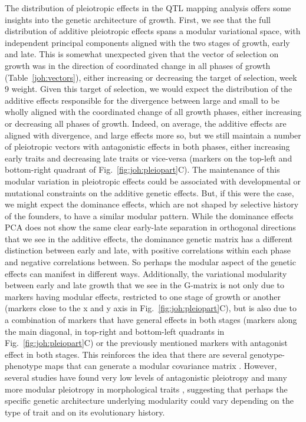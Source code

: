 \begin{refsection}
The distribution of pleiotropic effects in the QTL mapping analysis
offers some insights into the genetic architecture of growth. First, we
see that the full distribution of additive pleiotropic effects spans a
modular variational space, with independent principal components aligned
with the two stages of growth, early and late. This is somewhat
unexpected given that the vector of selection on growth was in the
direction of coordinated change in all phases of growth (Table~\ref{joh:vectors}),
either increasing or decreasing the target of selection, week 9 weight.
Given this target of selection, we would expect the distribution of the
additive effects responsible for the divergence between large and small
to be wholly aligned with the coordinated change of all growth phases,
either increasing or decreasing all phases of growth. Indeed, on
average, the additive effects are aligned with divergence, and large
effects more so, but we still maintain a number of pleiotropic vectors
with antagonistic effects in both phases, either increasing early traits
and decreasing late traits or vice-versa (markers on the top-left and
bottom-right quadrant of Fig.~\ref{fig:joh:pleiopart}C). The maintenance of this modular
variation in pleiotropic effects could be associated with developmental
or mutational constraints on the additive genetic effects. But, if this
were the case, we might expect the dominance effects, which are not
shaped by selective history of the founders, to have a similar modular
pattern. While the dominance effects PCA does not show the same clear
early-late separation in orthogonal directions that we see in the
additive effects, the dominance genetic matrix has a different
distinction between early and late, with positive correlations within
each phase and negative correlations between. So perhaps the modular
aspect of the genetic effects can manifest in different ways.
Additionally, the variational modularity between early and late growth
that we see in the G-matrix is not only due to markers having modular
effects, restricted to one stage of growth or another (markers close to
the x and y axis in Fig.~\ref{fig:joh:pleiopart}C), but is also due to a combination of
markers that have general effects in both stages (markers along the main
diagonal, in top-right and bottom-left quadrants in Fig.~\ref{fig:joh:pleiopart}C) or the
previously mentioned markers with antagonist effect in both stages. This
reinforces the idea that there are several genotype-phenotype maps that
can generate a modular covariance matrix \parencite{Pavlicev2011-xm}.
However, several studies have found very low levels of antagonistic
pleiotropy and many more modular pleiotropy in morphological traits
\parencite{Leamy1999-dm,Leamy2002-nh,Kenney-Hunt2008-bd}, suggesting that perhaps
the specific genetic architecture underlying modularity could vary
depending on the type of trait and on its evolutionary history.


\end{refsection}
